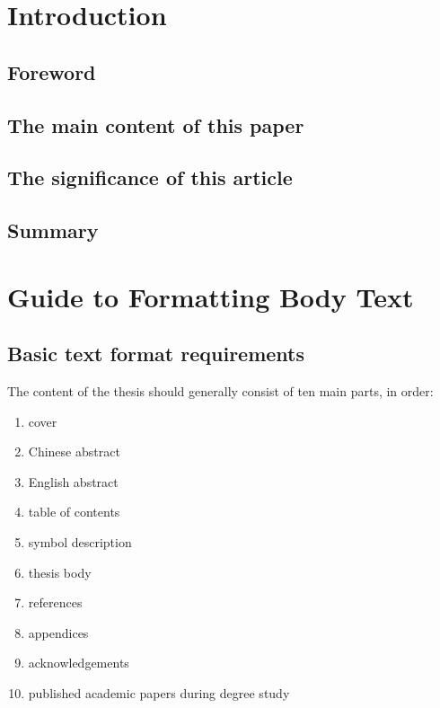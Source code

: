 \chapter{Introduction}

\section{Foreword}

\lipsum[1]

\section{The main content of this paper}

\lipsum[2]

\section{The significance of this article}

\lipsum[3]

\section{Summary}

\lipsum[4]


\chapter{Guide to Formatting Body Text}

\section{Basic text format requirements}

The content of the thesis should generally consist of ten main parts\cite{Jia2000}, in order:
\begin{enumerate}
  \item cover
  \item Chinese abstract
  \item English abstract
  \item table of contents
  \item symbol description
  \item thesis body
  \item references
  \item appendices
  \item acknowledgements
  \item published academic papers during degree study
\end{enumerate}

